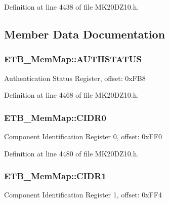 Definition at line 4438 of file M\+K20\+D\+Z10.\+h.



\subsection{Member Data Documentation}
\subsubsection[{\texorpdfstring{A\+U\+T\+H\+S\+T\+A\+T\+US}{AUTHSTATUS}}]{ E\+T\+B\+\_\+\+Mem\+Map\+::\+A\+U\+T\+H\+S\+T\+A\+T\+US}\hypertarget{struct_e_t_b___mem_map_a446ff3dd57fdb7ef19dcb892d05455a7}{}\label{struct_e_t_b___mem_map_a446ff3dd57fdb7ef19dcb892d05455a7}
Authentication Status Register, offset\+: 0x\+F\+B8 

Definition at line 4468 of file M\+K20\+D\+Z10.\+h.

\subsubsection[{\texorpdfstring{C\+I\+D\+R0}{CIDR0}}]{ E\+T\+B\+\_\+\+Mem\+Map\+::\+C\+I\+D\+R0}\hypertarget{struct_e_t_b___mem_map_a084d9f4d6b483f57a07d844cf1bf18d7}{}\label{struct_e_t_b___mem_map_a084d9f4d6b483f57a07d844cf1bf18d7}
Component Identification Register 0, offset\+: 0x\+F\+F0 

Definition at line 4480 of file M\+K20\+D\+Z10.\+h.

\subsubsection[{\texorpdfstring{C\+I\+D\+R1}{CIDR1}}]{ E\+T\+B\+\_\+\+Mem\+Map\+::\+C\+I\+D\+R1}\hypertarget{struct_e_t_b___mem_map_afc0480cceefc94fc8b2e730bb04cfd4f}{}\label{struct_e_t_b___mem_map_afc0480cceefc94fc8b2e730bb04cfd4f}
Component Identification Register 1, offset\+: 0x\+F\+F4 

